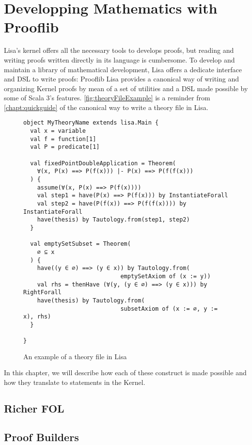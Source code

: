 \chapter{Developping Mathematics with Prooflib}
\label{chapt:prooflib}
Lisa's kernel offers all the necessary tools to develops proofs, but  reading and writing proofs written directly in its language is cumbersome. 
To develop and maintain a library of mathematical development, Lisa offers a dedicate interface and DSL to write proofs: Prooflib
Lisa provides a canonical way of writing and organizing Kernel proofs by mean of a set of utilities and a DSL made possible by some of Scala 3's features.
\autoref{fig:theoryFileExample} is a reminder from \autoref{chapt:quickguide} of the canonical way to write a theory file in Lisa.

\begin{figure}
\begin{lstlisting}[language=lisa, frame=single]
object MyTheoryName extends lisa.Main {
  val x = variable
  val f = function[1]
  val P = predicate[1]

  val fixedPointDoubleApplication = Theorem( 
    ∀(x, P(x) ==> P(f(x))) |- P(x) ==> P(f(f(x)))
  ) {
    assume(∀(x, P(x) ==> P(f(x))))
    val step1 = have(P(x) ==> P(f(x))) by InstantiateForall
    val step2 = have(P(f(x)) ==> P(f(f(x)))) by InstantiateForall
    have(thesis) by Tautology.from(step1, step2)
  } 

  val emptySetSubset = Theorem(
    ∅ ⊆ x
  ) {
    have((y ∈ ∅) ==> (y ∈ x)) by Tautology.from(
                            emptySetAxiom of (x := y))
    val rhs = thenHave (∀(y, (y ∈ ∅) ==> (y ∈ x))) by RightForall
    have(thesis) by Tautology.from(
                            subsetAxiom of (x := ∅, y := x), rhs)
  }

}
\end{lstlisting}
\caption{An example of a theory file in Lisa}
\label{fig:theoryFileExample}
\end{figure}

In this chapter, we will describe how each of these construct is made possible and how they translate to statements in the Kernel.

\section{Richer FOL}



\section{Proof Builders}

